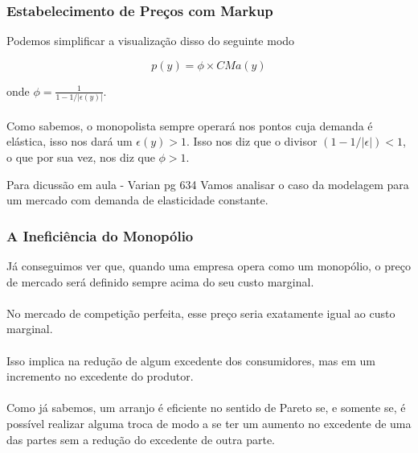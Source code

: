 \documentclass{beamer}[10]
\begin{document}
\begin{frame}
	\frametitle{Estabelecimento de Preços com Markup}

	Podemos simplificar a visualização disso do seguinte modo
	
	$$ p(y) = \phi \times CMa(y) $$
	
	onde $\phi = \frac{1}{1 - 1/|\epsilon(y)|}$.
	\\~\\
	Como sabemos, o monopolista sempre operará nos pontos cuja demanda é elástica, isso nos dará um $\epsilon(y) > 1$. Isso nos diz que o divisor $(1 - 1/|\epsilon|) <  1$, o que por sua vez, nos diz que $\phi > 1$.

	\begin{block}{Para dicussão em aula - Varian pg 634}
		Vamos analisar o caso da modelagem para um mercado com demanda de elasticidade constante.
	\end{block}
\end{frame}


\begin{frame}
	\frametitle{A Ineficiência do Monopólio}
	
	Já conseguimos ver que, quando uma empresa opera como um monopólio, o preço de mercado será definido sempre acima do seu custo marginal.
	\\~\\
	No mercado de competição perfeita, esse preço seria exatamente igual ao custo marginal. 
	\\~\\
	Isso implica na redução de algum excedente dos consumidores, mas em um incremento no excedente do produtor.
	\\~\\
	Como já sabemos, um arranjo é eficiente no sentido de Pareto se, e somente se, é possível realizar alguma troca de modo a se ter um aumento no excedente de uma das partes sem a redução do excedente de outra parte.
\end{frame}
\end{document}
